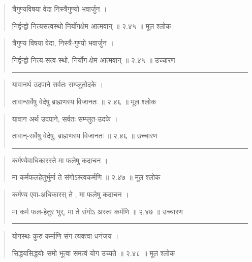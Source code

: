 \begin{quotation}

त्रैगुण्यविषया वेदा निस्त्रैगुण्यो भवार्जुन  ।  

निर्द्वन्द्वो नित्यसत्वस्थो निर्योगक्षेम आत्मवान्‌  ॥ २.४५ ॥  मूल श्लोक
\end{quotation}

\begin{quotation}
त्रैगुण्य विषया वेदा, निस्त्रै-गुण्यो भवार्जुन  ।  

निर्द्वन्द्वो नित्य-सत्व-स्थो, निर्योग-क्षेम आत्मवान्‌  ॥ २.४५ ॥  उच्चारण

\noindent\rule{16cm}{0.4pt} 
\end{quotation}


\begin{quotation}

यावानर्थ उदपाने सर्वतः सम्प्लुतोदके  ।  

तावान्सर्वेषु वेदेषु ब्राह्मणस्य विजानतः  ॥ २.४६ ॥  मूल श्लोक
\end{quotation}

\begin{quotation}

यावान अर्थ उदपाने, सर्वतः सम्प्लुत-उदके  ।  

तावान्-सर्वेषु वेदेषु, ब्राह्मणस्य विजानतः  ॥ २.४६ ॥  उच्चारण

\noindent\rule{16cm}{0.4pt} 
\end{quotation}


\begin{quotation}

कर्मण्येवाधिकारस्ते मा फलेषु कदाचन  ।  

मा कर्मफलहेतुर्भुर्मा ते संगोऽस्त्वकर्मणि  ॥ २.४७ ॥  मूल श्लोक
\end{quotation}

\begin{quotation}

कर्मण्य एवा-अधिकारस् ते , मा फलेषु कदाचन  ।  

मा कर्म फल-हेतुर भुर्, मा ते संगोऽ अस्त्व कर्मणि  ॥ २.४७ ॥  उच्चारण

\noindent\rule{16cm}{0.4pt} 
\end{quotation}


\begin{quotation}

योगस्थः कुरु कर्माणि संग त्यक्त्वा धनंजय  ।  

सिद्धयसिद्धयोः समो भूत्वा समत्वं योग उच्यते  ॥ २.४८ ॥  मूल श्लोक
\end{quotation}

